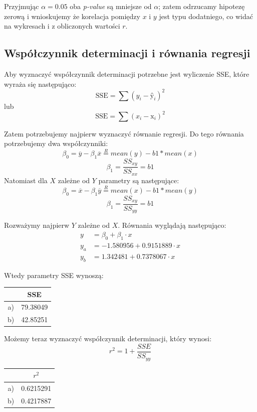 \documentclass{article}
\begin{document}
Przyjmując $\alpha = 0.05$ oba \textit{p-value} są mniejsze od $\alpha$; zatem odrzucamy hipotezę zerową i wnioskujemy że korelacja pomiędzy $x$ i $y$ jest typu dodatniego, co widać na wykresach i z obliczonych wartości $r$. \\ \par

\subsection{Współczynnik determinacji i równania regresji}
Aby wyznaczyć współczynnik determinacji potrzebne jest wyliczenie SSE, które wyraża się następująco:
\[ \text{SSE} = \sum (y_i - \text{\^y}_i)^2 \]
lub
\[ \text{SSE} = \sum (x_i - \text{\^x}_i)^2 \]

Zatem potrzebujemy najpierw wyznaczyć równanie regresji. Do tego równania potrzebujemy dwa współczynniki:
\[ \beta_0 = \overline{y} - \beta_1 \overline{x} \overset{R}{=} mean(y) - b1*mean(x) \]
\[ \beta_1 = \frac{SS_{xy}}{SS_{xx}} = b1\]
Natomiast dla $X$ zależne od $Y$ parametry są następujące:
\[ \beta_0 = \overline{x} - \beta_1 \overline{y} \overset{R}{=} mean(x) - b1*mean(y) \]
\[ \beta_1 = \frac{SS_{xy}}{SS_{yy}} = b1\]

Rozważymy najpierw $Y$ zależne od $X$. Równania wyglądają następująco:
\begin{align*}
y & = \beta_0 + \beta_1 \cdot x \\
y_a & = -1.580956  +  0.9151889 \cdot x \\
y_b & = 1.342481  +  0.7378067 \cdot x
\end{align*}

Wtedy parametry SSE wynoszą:
\begin{center} \begin{tabular}{|c|c|} \hline
& SSE \\ \hline
a) & 79.38049 \\ \hline
b) & 42.85251 \\ \hline
\end{tabular} \end{center}

Możemy teraz wyznaczyć współczynnik determinacji, który wynosi:
\[ r^2 = 1 + \frac{SSE}{SS_{yy}} \]
\begin{center} \begin{tabular}{|c|c|} \hline
& $r^2$ \\ \hline
a) & 0.6215291 \\ \hline
b) & 0.4217887 \\ \hline
\end{tabular} \end{center}
\end{document}
